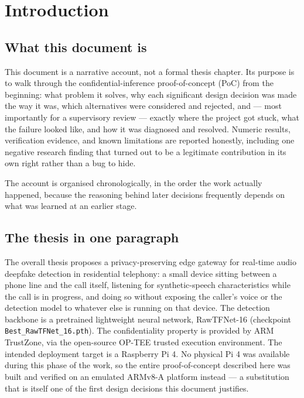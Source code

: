 \documentclass[11pt,a4paper]{report}
\newcommand{\code}[1]{\texttt{\small #1}}
\begin{document}
\chapter{Introduction}

\section{What this document is}

This document is a narrative account, not a formal thesis chapter. Its purpose is to walk
through the confidential-inference proof-of-concept (PoC) from the beginning: what problem it
solves, why each significant design decision was made the way it was, which alternatives were
considered and rejected, and --- most importantly for a supervisory review --- exactly where the
project got stuck, what the failure looked like, and how it was diagnosed and resolved. Numeric
results, verification evidence, and known limitations are reported honestly, including one
negative research finding that turned out to be a legitimate contribution in its own right rather
than a bug to hide.

The account is organised chronologically, in the order the work actually happened, because the
reasoning behind later decisions frequently depends on what was learned at an earlier stage.

\section{The thesis in one paragraph}

The overall thesis proposes a privacy-preserving edge gateway for real-time audio deepfake
detection in residential telephony: a small device sitting between a phone line and the call
itself, listening for synthetic-speech characteristics while the call is in progress, and doing so
without exposing the caller's voice or the detection model to whatever else is running on that
device. The detection backbone is a pretrained lightweight neural network, RawTFNet-16
(checkpoint \code{Best\_RawTFNet\_16.pth}). The confidentiality property is provided by ARM
TrustZone, via the open-source OP-TEE trusted execution environment. The intended deployment
target is a Raspberry Pi 4. No physical Pi 4 was available during this phase of the work, so the
entire proof-of-concept described here was built and verified on an emulated ARMv8-A platform
instead --- a substitution that is itself one of the first design decisions this document
justifies.
\end{document}
